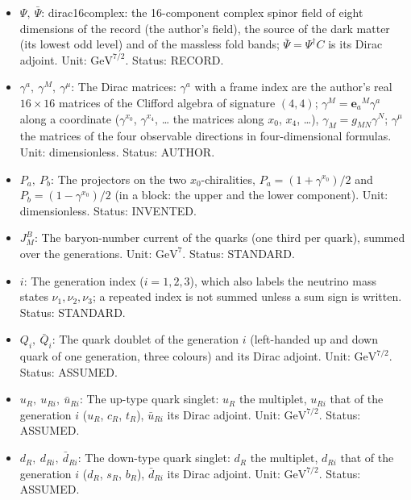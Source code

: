 \documentclass[
  10pt,
]{article}
\begin{document}
\begin{itemize}
  dimensionless. Status: STANDARD.
\item
  \(\Psi,\ \bar\Psi\): dirac16complex: the 16-component complex spinor
  field of eight dimensions of the record (the author's field), the
  source of the dark matter (its lowest odd level) and of the massless
  fold bands; \(\bar\Psi = \Psi^\dagger C\) is its Dirac adjoint. Unit:
  \(\mathrm{GeV}^{7/2}\). Status: RECORD.
\item
  \(\gamma^a,\ \gamma^M,\ \gamma^\mu\): The Dirac matrices: \(\gamma^a\)
  with a frame index are the author's real \(16 \times 16\) matrices of
  the Clifford algebra of signature \((4, 4)\);
  \(\gamma^M = \mathbf{e}_a{}^M\gamma^a\) along a coordinate
  (\(\gamma^{x_0}\), \(\gamma^{x_4}\), \ldots{} the matrices along
  \(x_0\), \(x_4\), \ldots), \(\gamma_M = g_{MN}\gamma^N\);
  \(\gamma^\mu\) the matrices of the four observable directions in
  four-dimensional formulas. Unit: dimensionless. Status: AUTHOR.
\item
  \(P_a,\ P_b\): The projectors on the two \(x_0\)-chiralities,
  \(P_a = (1 + \gamma^{x_0})/2\) and \(P_b = (1 - \gamma^{x_0})/2\) (in
  a block: the upper and the lower component). Unit: dimensionless.
  Status: INVENTED.
\item
  \(J^{B}_M\): The baryon-number current of the quarks (one third per
  quark), summed over the generations. Unit: \(\mathrm{GeV}^{7}\).
  Status: STANDARD.
\item
  \(i\): The generation index (\(i = 1, 2, 3\)), which also labels the
  neutrino mass states \(\nu_1, \nu_2, \nu_3\); a repeated index is not
  summed unless a sum sign is written. Status: STANDARD.
\item
  \(Q_i,\ \bar Q_i\): The quark doublet of the generation \(i\)
  (left-handed up and down quark of one generation, three colours) and
  its Dirac adjoint. Unit: \(\mathrm{GeV}^{7/2}\). Status: ASSUMED.
\item
  \(u_R,\ u_{Ri},\ \bar u_{Ri}\): The up-type quark singlet: \(u_R\) the
  multiplet, \(u_{Ri}\) that of the generation \(i\) (\(u_R\), \(c_R\),
  \(t_R\)), \(\bar u_{Ri}\) its Dirac adjoint. Unit:
  \(\mathrm{GeV}^{7/2}\). Status: ASSUMED.
\item
  \(d_R,\ d_{Ri},\ \bar d_{Ri}\): The down-type quark singlet: \(d_R\)
  the multiplet, \(d_{Ri}\) that of the generation \(i\) (\(d_R\),
  \(s_R\), \(b_R\)), \(\bar d_{Ri}\) its Dirac adjoint. Unit:
  \(\mathrm{GeV}^{7/2}\). Status: ASSUMED.
\end{itemize}
\end{document}
